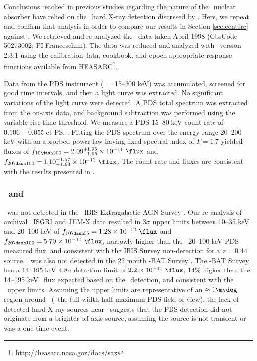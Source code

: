 \documentclass[useAMS,usenatbib]{mn2e}
\begin{document}
\subsubsection{\bepposax}

Conclusions reached in previous studies regarding the nature of the
\irs\ nuclear absorber have relied on the \bepposax\ hard X-ray
detection discussed by \citet{2000A&A...353..910F}. Here, we repeat
and confirm that analysis in order to compare our results in Section
\ref{sec:centsrc} against \citet{2000A&A...353..910F}. We retrieved
and re-analyzed the \bepposax\ data taken April 1998 (ObsCode
50273002; PI Franceschini). The data was reduced and analyzed with
\saxdas\ version 2.3.1 using the calibration data, cookbook, and epoch
appropriate response functions available from
HEASARC\footnote{http://heasarc.nasa.gov/docs/sax}.

Data from the PDS instrument (\esens\ = 15--300 keV) was accumulated,
screened for good time intervals, and then a light curve was
extracted. No significant variations of the light curve were
detected. A PDS total spectrum was extracted from the on-axis data,
and background subtraction was performed using the variable rise time
threshold. We measure a PDS 15--80 keV count rate of $0.106 \pm 0.055$
ct \ps. Fitting the PDS spectrum over the energy range 20--200 keV
with an absorbed power-law having fixed spectral index of $\Gamma =
1.7$ yielded fluxes of $f_{10 \dash 200} = 2.09^{+1.95}_{-1.95} \times
10^{-11} ~\flux$ and $f_{20 \dash 100} = 1.10^{+1.57}_{-1.63} \times
10^{-11} ~\flux$. The count rate and fluxes are consistent with the
results presented in \citet{2000A&A...353..910F}.

\subsubsection{\integral\ and \swift}

\irs\ was not detected in the \integral\ IBIS Extragalactic AGN Survey
\citep[][\esens\ = 20--100 keV]{2006ApJ...636L..65B}. Our re-analysis
of archival \integral\ ISGRI and JEM-X data resulted in $3\sigma$
upper limits between 10--35 keV and 20--100 keV of $f_{10 \dash 35} =
1.28 \times 10^{-12} ~\flux$ and $f_{20 \dash 100} = 5.70 \times
10^{-11} ~\flux$, narrowly higher than the \bepposax\ 20--100 keV PDS
measured flux, and consistent with the IBIS Survey non-detection for a
$z = 0.44$ source. \irs\ was also not detected in the 22 month
\swift-BAT Survey \citep[][\esens\ = 15--150
  keV]{2010ApJS..186..378T}. The \swift-BAT Survey has a 14--195 keV
$4.8\sigma$ detection limit of $2.2 \times 10^{-11} ~\flux$, 14\%
higher than the 14--195 keV \irs\ flux expected based on the
\bepposax\ detection, and consistent with the \integral\ upper
limits. Assuming the upper limits are representative of an $\approx
1\mydeg$ region around \irs\ (\ie\ the full-width half maximum PDS
field of view), the lack of detected hard X-ray sources near
\irs\ suggests that the PDS detection did not originate from a
brighter off-axis source, assuming the source is not transient or was
a one-time event.
\end{document}
